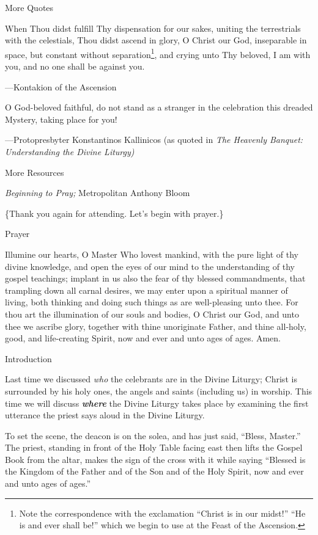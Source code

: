 \documentclass[
]{article}
\begin{document}
More Quotes

When Thou didst fulfill Thy dispensation for our sakes, uniting the
terrestrials with the celestials, Thou didst ascend in glory, O Christ
our God, inseparable in space, but constant without
separation\footnote{Note the correspondence with the exclamation
  ``Christ is in our midst!'' ``He is and ever shall be!'' which we
  begin to use at the Feast of the Ascension.}, and crying unto Thy
beloved, I am with you, and no one shall be against you.

---Kontakion of the Ascension

O God-beloved faithful, do not stand as a stranger in the celebration
this dreaded Mystery, taking place for you!

---Protopresbyter Konstantinos Kallinicos (as quoted in \emph{The
Heavenly Banquet: Understanding the Divine Liturgy)}

More Resources

\emph{Beginning to Pray;} Metropolitan Anthony Bloom

\{Thank you again for attending. Let's begin with prayer.\}

Prayer

Illumine our hearts, O Master Who lovest mankind, with the pure light of
thy divine knowledge, and open the eyes of our mind to the understanding
of thy gospel teachings; implant in us also the fear of thy blessed
commandments, that trampling down all carnal desires, we may enter upon
a spiritual manner of living, both thinking and doing such things as are
well-pleasing unto thee. For thou art the illumination of our souls and
bodies, O Christ our God, and unto thee we ascribe glory, together with
thine unoriginate Father, and thine all-holy, good, and life-creating
Spirit, now and ever and unto ages of ages. Amen.

Introduction

Last time we discussed \emph{who} the celebrants are in the Divine
Liturgy; Christ is surrounded by his holy ones, the angels and saints
(including us) in worship. This time we will discuss
\textbf{\emph{where}} the Divine Liturgy takes place by examining the
first utterance the priest says aloud in the Divine Liturgy.

To set the scene, the deacon is on the solea, and has just said,
``Bless, Master.'' The priest, standing in front of the Holy Table
facing east then lifts the Gospel Book from the altar, makes the sign of
the cross with it while saying ``Blessed is the Kingdom of the Father
and of the Son and of the Holy Spirit, now and ever and unto ages of
ages.''
\end{document}
